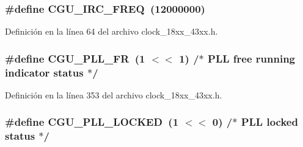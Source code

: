 \subsubsection[{\texorpdfstring{C\+G\+U\+\_\+\+I\+R\+C\+\_\+\+F\+R\+EQ}{CGU_IRC_FREQ}}]{\setlength{\rightskip}{0pt plus 5cm}\#define C\+G\+U\+\_\+\+I\+R\+C\+\_\+\+F\+R\+EQ~(12000000)}\hypertarget{group___c_l_o_c_k__18_x_x__43_x_x_gaec3e2b28e900580cc4dc72034f7371fd}{}\label{group___c_l_o_c_k__18_x_x__43_x_x_gaec3e2b28e900580cc4dc72034f7371fd}


Definición en la línea 64 del archivo clock\+\_\+18xx\+\_\+43xx.\+h.

\subsubsection[{\texorpdfstring{C\+G\+U\+\_\+\+P\+L\+L\+\_\+\+FR}{CGU_PLL_FR}}]{\setlength{\rightskip}{0pt plus 5cm}\#define C\+G\+U\+\_\+\+P\+L\+L\+\_\+\+FR~(1 $<$$<$ 1)	/$\ast$ P\+LL free running indicator status $\ast$/}\hypertarget{group___c_l_o_c_k__18_x_x__43_x_x_gafa8279d333ad3959b13d9ad5c57787df}{}\label{group___c_l_o_c_k__18_x_x__43_x_x_gafa8279d333ad3959b13d9ad5c57787df}


Definición en la línea 353 del archivo clock\+\_\+18xx\+\_\+43xx.\+h.

\subsubsection[{\texorpdfstring{C\+G\+U\+\_\+\+P\+L\+L\+\_\+\+L\+O\+C\+K\+ED}{CGU_PLL_LOCKED}}]{\setlength{\rightskip}{0pt plus 5cm}\#define C\+G\+U\+\_\+\+P\+L\+L\+\_\+\+L\+O\+C\+K\+ED~(1 $<$$<$ 0)	/$\ast$ P\+LL locked status $\ast$/}\hypertarget{group___c_l_o_c_k__18_x_x__43_x_x_ga8d7042242ace9a2ae21d16181ce51a2d}{}\label{group___c_l_o_c_k__18_x_x__43_x_x_ga8d7042242ace9a2ae21d16181ce51a2d}


